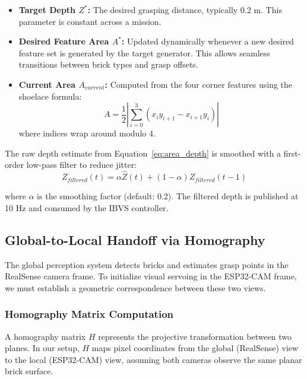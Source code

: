\begin{itemize}
    \item \textbf{Target Depth $Z^*$:} The desired grasping distance, typically 0.2 m. This parameter is constant across a mission.
    
    \item \textbf{Desired Feature Area $A^*$:} Updated dynamically whenever a new desired feature set is generated by the target generator. This allows seamless transitions between brick types and grasp offsets.
    
    \item \textbf{Current Area $A_{current}$:} Computed from the four corner features using the shoelace formula:
    \begin{equation}
        A = \frac{1}{2} \left| \sum_{i=0}^{3} (x_i y_{i+1} - x_{i+1} y_i) \right|
    \end{equation}
    where indices wrap around modulo 4.
\end{itemize}

The raw depth estimate from Equation~\ref{eq:area_depth} is smoothed with a first-order low-pass filter to reduce jitter:
\begin{equation}
    Z_{filtered}(t) = \alpha \hat{Z}(t) + (1 - \alpha) Z_{filtered}(t-1)
\end{equation}

where $\alpha$ is the smoothing factor (default: 0.2). The filtered depth is published at 10 Hz and consumed by the IBVS controller.

\subsection{Global-to-Local Handoff via Homography}

The global perception system detects bricks and estimates grasp points in the RealSense camera frame. To initialize visual servoing in the ESP32-CAM frame, we must establish a geometric correspondence between these two views.

\subsubsection{Homography Matrix Computation}
A homography matrix $H$ represents the projective transformation between two planes. In our setup, $H$ maps pixel coordinates from the global (RealSense) view to the local (ESP32-CAM) view, assuming both cameras observe the same planar brick surface.


